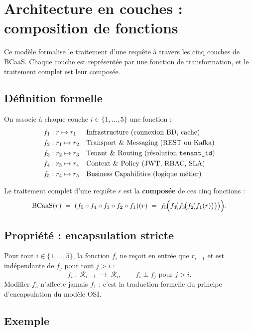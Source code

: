 \section{Architecture en couches : composition de fonctions}

Ce modèle formalise le traitement d'une requête à travers les cinq
couches de BCaaS. Chaque couche est représentée par une fonction de
transformation, et le traitement complet est leur composée.

\subsection{Définition formelle}

On associe à chaque couche $i \in \{1,\ldots,5\}$ une fonction :
\begin{align*}
f_1 &: r   \mapsto r_1 && \text{Infrastructure (connexion BD, cache)}\\
f_2 &: r_1 \mapsto r_2 && \text{Transport \& Messaging (REST ou Kafka)}\\
f_3 &: r_2 \mapsto r_3 && \text{Tenant \& Routing (résolution \texttt{tenant\_id})}\\
f_4 &: r_3 \mapsto r_4 && \text{Context \& Policy (JWT, RBAC, SLA)}\\
f_5 &: r_4 \mapsto r_5 && \text{Business Capabilities (logique métier)}
\end{align*}

Le traitement complet d'une requête $r$ est la \textbf{composée} de
ces cinq fonctions :
\[
\text{BCaaS}(r)
\;=\;
(f_5 \circ f_4 \circ f_3 \circ f_2 \circ f_1)(r)
\;=\;
f_5\!\Bigl(f_4\!\bigl(f_3\!\bigl(f_2\!\bigl(f_1(r)\bigr)\bigr)\bigr)\Bigr).
\]

\subsection{Propriété : encapsulation stricte}

Pour tout $i \in \{1,\ldots,5\}$, la fonction $f_i$ ne reçoit en entrée
que $r_{i-1}$ et est indépendante de $f_j$ pour tout $j > i$ :
\[
f_i \;:\; \mathcal{R}_{i-1} \;\longrightarrow\; \mathcal{R}_i,
\qquad f_i \perp f_j \text{ pour } j > i.
\]
Modifier $f_5$ n'affecte jamais $f_1$ : c'est la traduction formelle du
principe d'encapsulation du modèle OSI.

\subsection{Exemple}

